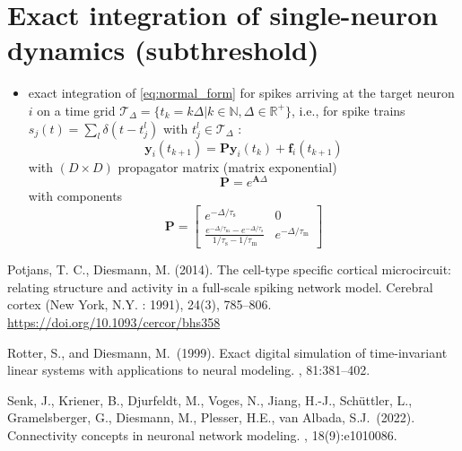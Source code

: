 \documentclass[10pt,a4paper,twoside,american]{article}
\theoremstyle{definitionstyle}
\newcommand{\tauM}{\tau_\text{m}}
\newcommand{\tauS}{\tau_\text{s}}
\begin{document}
\section{Exact integration of  single-neuron dynamics (subthreshold)}
\label{sec:exact_integration}

\begin{itemize}
\item exact integration of \eqref{eq:normal_form} for spikes arriving at the target neuron $i$ on a time grid
  \mbox{$\mathcal{T}_\Delta= \{t_k=k\Delta{}|k\in\mathbb{N},\Delta\in\mathbb{R}^+\}$}, i.e.,
  for spike trains \mbox{$s_j(t) = \sum_l\delta(t-t_j^l)$} with $t_j^l\in\mathcal{T}_\Delta$ \citep{Rotter99_381}:
  \begin{equation}
    \label{eq:exact_integration}
    \bm{y}_i(t_{k+1}) = \bm{P}\bm{y}_i(t_k) + \bm{f}_i(t_{k+1})
  \end{equation}
  with $(D\times{}D)$ propagator matrix (matrix exponential)
  \begin{equation}
    \label{eq:matrix_exponential}
    \bm{P} = e^{\bm{A}\Delta}
  \end{equation}
  with components 
  \begin{equation}
	\bm{P} =
	\begin{bmatrix}
      		e^{-\Delta/\tauS} 					     & 0\\
		\frac{e^{-\Delta/\tauM}-e^{-\Delta/\tauS}}{1/\tauS-1/\tauM}  & e^{-\Delta/\tauM}
    	\end{bmatrix}
  \end{equation}
  \citep[see Sec.\,3.2.2 in][]{Rotter99_381}
\end{itemize}

\clearpage
\begin{thebibliography}{}

  Potjans, T. C., Diesmann, M. (2014).
  \newblock The cell-type specific cortical microcircuit: relating structure and activity in a full-scale spiking network model. 
  \newblock Cerebral cortex (New York, N.Y. : 1991), 24(3), 785–806.
  \newblock \url{https://doi.org/10.1093/cercor/bhs358}

  Rotter, S., and Diesmann, M.~(1999).
  \newblock Exact digital simulation of time-invariant linear systems with applications to neural modeling.
  , 81:381--402.

  Senk, J., Kriener, B., Djurfeldt, M., Voges, N., Jiang, H.-J., Sch\"uttler, L., Gramelsberger, G., Diesmann, M., Plesser, H.E., van Albada, S.J.~(2022).
  \newblock Connectivity concepts in neuronal network modeling.
  , 18(9):e1010086.

  
\end{thebibliography}
\end{document}
